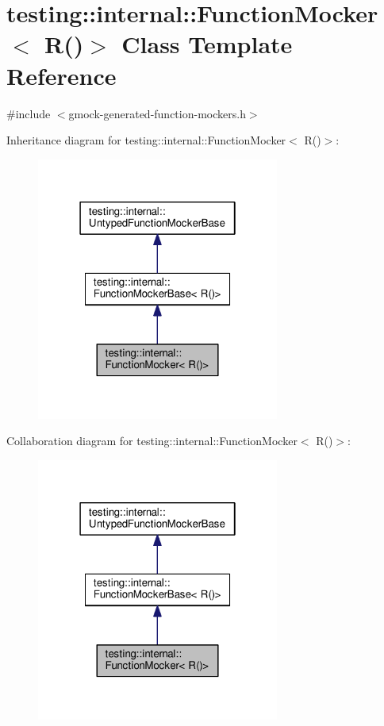\hypertarget{classtesting_1_1internal_1_1_function_mocker_3_01_r_07_08_4}{}\section{testing\+:\+:internal\+:\+:Function\+Mocker$<$ R()$>$ Class Template Reference}
\label{classtesting_1_1internal_1_1_function_mocker_3_01_r_07_08_4}


{\ttfamily \#include $<$gmock-\/generated-\/function-\/mockers.\+h$>$}



Inheritance diagram for testing\+:\+:internal\+:\+:Function\+Mocker$<$ R()$>$\+:
\nopagebreak
\begin{figure}[H]
\begin{center}
\leavevmode
\includegraphics[width=226pt]{classtesting_1_1internal_1_1_function_mocker_3_01_r_07_08_4__inherit__graph}
\end{center}
\end{figure}


Collaboration diagram for testing\+:\+:internal\+:\+:Function\+Mocker$<$ R()$>$\+:
\nopagebreak
\begin{figure}[H]
\begin{center}
\leavevmode
\includegraphics[width=226pt]{classtesting_1_1internal_1_1_function_mocker_3_01_r_07_08_4__coll__graph}
\end{center}
\end{figure}

